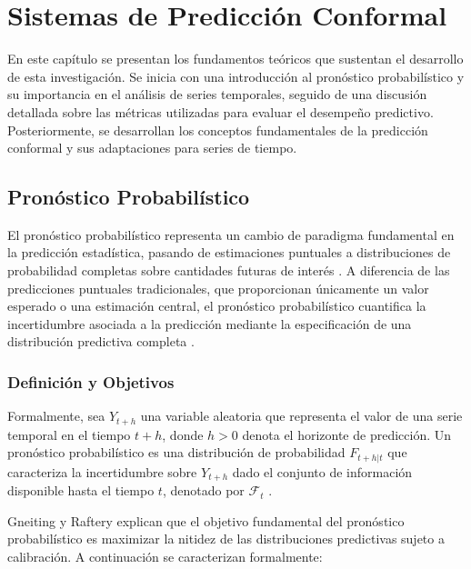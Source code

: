 \chapter{Sistemas de Predicción Conformal}
\label{cap:marco_teorico}

En este capítulo se presentan los fundamentos teóricos que sustentan el desarrollo de esta investigación. Se inicia con una introducción al pronóstico probabilístico y su importancia en el análisis de series temporales, seguido de una discusión detallada sobre las métricas utilizadas para evaluar el desempeño predictivo. Posteriormente, se desarrollan los conceptos fundamentales de la predicción conformal y sus adaptaciones para series de tiempo.

\section{Pronóstico Probabilístico}
\label{sec:pronostico_probabilistico}

El pronóstico probabilístico representa un cambio de paradigma fundamental en la predicción estadística, pasando de estimaciones puntuales a distribuciones de probabilidad completas sobre cantidades futuras de interés \parencite{Gneiting2014}. A diferencia de las predicciones puntuales tradicionales, que proporcionan únicamente un valor esperado o una estimación central,
el pronóstico probabilístico cuantifica la incertidumbre asociada a la predicción mediante la especificación de una distribución predictiva completa \parencite{GneitingBalabdaoui2007}.

\subsection{Definición y Objetivos}

Formalmente, sea $Y_{t+h}$ una variable aleatoria que representa el valor de una serie temporal en el tiempo $t+h$, donde $h>0$ denota el horizonte de predicción. Un pronóstico probabilístico es una distribución de probabilidad $F_{t+h|t}$ que caracteriza la incertidumbre sobre $Y_{t+h}$ dado el conjunto de información disponible hasta el tiempo $t$, denotado por $\mathcal{F}_t$ \parencite{Gneiting2014}.

Gneiting y Raftery explican que el objetivo fundamental del pronóstico probabilístico es maximizar la nitidez de las distribuciones predictivas sujeto a calibración. A continuación se caracterizan formalmente:

